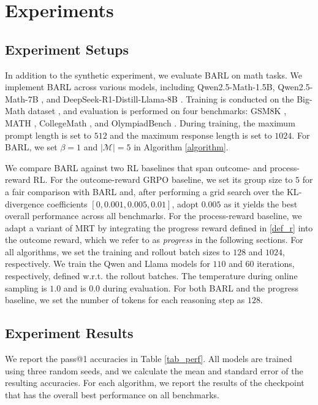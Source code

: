 \section{Experiments}
\subsection{Experiment Setups}\label{sec_expsetup}
In addition to the synthetic experiment, we evaluate BARL on math tasks. We implement BARL across various models, including Qwen2.5-Math-1.5B, Qwen2.5-Math-7B \citep{yang2024qwen25mathtechnicalreportmathematical}, and DeepSeek-R1-Distill-Llama-8B \citep{guo2025deepseek}. Training is conducted on the Big-Math dataset \citep{albalak2025big}, and evaluation is performed on four benchmarks: GSM8K \citep{cobbe2021training}, MATH \citep{hendrycks2021measuring}, CollegeMath \citep{tang2024mathscale}, and OlympiadBench \citep{he2024olympiadbench}. During training, the maximum prompt length is set to $512$ and the maximum response length is set to $1024$. For BARL, we set $\beta=1$ and $|\mathcal{M}|=5$ in Algorithm \ref{algorithm}.

We compare BARL against two RL baselines that span outcome- and process-reward RL. For the outcome-reward GRPO baseline, we set its group size to $5$ for a fair comparison with BARL and, after performing a grid search over the KL‐divergence coefficients $[0, 0.001, 0.005, 0.01]$, adopt $0.005$ as it yields the best overall performance across all benchmarks. For the process-reward baseline, we adapt a variant of MRT \citep{qu2025optimizing} by integrating the progress reward defined in \eqref{def_r} into the outcome reward, which we refer to as \textit{progress} in the following sections. For all algorithms, we set the training and rollout batch sizes to $128$ and $1024$, respectively. We train the Qwen and Llama models for $110$ and $60$ iterations, respectively, defined w.r.t. the rollout batches. The temperature during online sampling is $1.0$ and is $0.0$ during evaluation. For both BARL and the progress baseline, we set the number of tokens for each reasoning step as $128$.

\subsection{Experiment Results}
We report the pass@1 accuracies in Table \ref{tab_perf}. All models are trained using three random seeds, and we calculate the mean and standard error of the resulting accuracies. For each algorithm, we report the results of the checkpoint that has the overall best performance on all benchmarks. 

